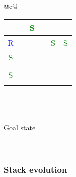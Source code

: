 \begin{multicols}{3}
		\begin{tabular}[c]{@{}c@{}}
			\setlength\tabcolsep{3pt}
			\begin{tabular}{|c|c|c|c|c|c|}
				\hline
					&		&	\textcolor{green}{S}	&		&		&	 \\ \hline
				\textcolor{blue}{R}	&		&		&		&	\textcolor{green}{S}	&	\textcolor{green}{S} \\ \hline
				\textcolor{green}{S}	&		&		&		&		&	 \\ \hline
					&		&		&		&		&	 \\ \hline
				\textcolor{green}{S}	&		&		&		&		&	 \\ \hline
					&		&		&		&		&	 \\ \hline
			\end{tabular}
			\\
			\\
			
			\\
			Goal state
			\\
			\\
			\\
		\end{tabular}
	

		\end{multicols}
	
\subsubsection{Stack evolution}

